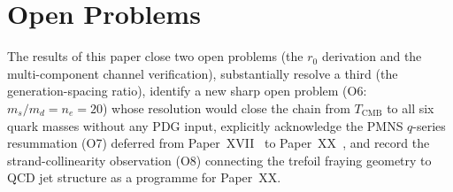 \documentclass[11pt,a4paper]{article}
\theoremstyle{definition}\newtheorem{definition}[theorem]{Definition}
\theoremstyle{remark}
\begin{document}
\section{Open Problems}
\label{P19:sec:open}

The results of this paper close two open problems (the $r_0$
derivation and the multi-component channel verification),
substantially resolve a third (the generation-spacing ratio),
identify a new sharp open problem (O6: $m_s/m_d=n_e=20$)
whose resolution would close the chain from $T_{\mathrm{CMB}}$ to
all six quark masses without any PDG input, explicitly
acknowledge the PMNS $q$-series resummation (O7) deferred
from Paper~XVII~\cite{Paper17} to Paper~XX~\cite{Paper20}, and record the
strand-collinearity observation (O8) connecting the trefoil
fraying geometry to QCD jet structure as a programme for
Paper~XX.
\end{document}
